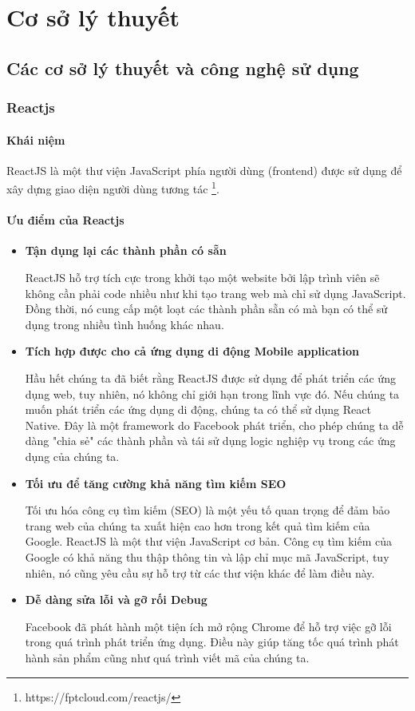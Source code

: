\chapter{Cơ sở lý thuyết}
\section{Các cơ sở lý thuyết và công nghệ sử dụng}
\subsection{Reactjs}
\subsubsection{Khái niệm}
\indent ReactJS là một thư viện JavaScript phía người dùng (frontend) được sử dụng để xây dựng giao diện người dùng tương tác \footnote{https://fptcloud.com/reactjs/}.
\subsubsection{Ưu điểm của Reactjs}
\begin{itemize}
    \item \textbf{Tận dụng lại các thành phần có sẵn}

    \indent ReactJS hỗ trợ tích cực trong khởi tạo một website bởi lập trình viên sẽ không cần phải code nhiều như khi tạo trang web mà chỉ sử dụng JavaScript. Đồng thời, nó cung cấp một loạt các thành phần sẵn có mà bạn có thể sử dụng trong nhiều tình huống khác nhau.
    \item \textbf{Tích hợp được cho cả ứng dụng di động Mobile application}

    \indent Hầu hết chúng ta đã biết rằng ReactJS được sử dụng để phát triển các ứng dụng web, tuy nhiên, nó không chỉ giới hạn trong lĩnh vực đó. Nếu chúng ta muốn phát triển các ứng dụng di động, chúng ta có thể sử dụng React Native. Đây là một framework do Facebook phát triển, cho phép chúng ta dễ dàng "chia sẻ" các thành phần và tái sử dụng logic nghiệp vụ trong các ứng dụng của chúng ta.
    \item \textbf{Tối ưu để tăng cường khả năng tìm kiếm SEO}

    \indent Tối ưu hóa công cụ tìm kiếm (SEO) là một yếu tố quan trọng để đảm bảo trang web của chúng ta xuất hiện cao hơn trong kết quả tìm kiếm của Google. ReactJS là một thư viện JavaScript cơ bản. Công cụ tìm kiếm của Google có khả năng thu thập thông tin và lập chỉ mục mã JavaScript, tuy nhiên, nó cũng yêu cầu sự hỗ trợ từ các thư viện khác để làm điều này.
    \item \textbf{Dễ dàng sửa lỗi và gỡ rối Debug}

    \indent Facebook đã phát hành một tiện ích mở rộng Chrome để hỗ trợ việc gỡ lỗi trong quá trình phát triển ứng dụng. Điều này giúp tăng tốc quá trình phát hành sản phẩm cũng như quá trình viết mã của chúng ta.
\end{itemize}
